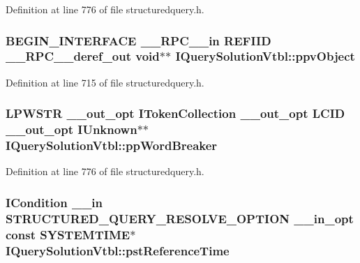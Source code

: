 Definition at line 776 of file structuredquery.\+h.

\subsubsection[{\texorpdfstring{ppv\+Object}{ppvObject}}]{\setlength{\rightskip}{0pt plus 5cm}B\+E\+G\+I\+N\+\_\+\+I\+N\+T\+E\+R\+F\+A\+CE {\bf \+\_\+\+\_\+\+R\+P\+C\+\_\+\+\_\+in} {\bf R\+E\+F\+I\+ID} {\bf \+\_\+\+\_\+\+R\+P\+C\+\_\+\+\_\+deref\+\_\+out} {\bf void}$\ast$$\ast$ I\+Query\+Solution\+Vtbl\+::ppv\+Object}\hypertarget{struct_i_query_solution_vtbl_a7b7925aac3252d89c5d16423a4005ba3}{}\label{struct_i_query_solution_vtbl_a7b7925aac3252d89c5d16423a4005ba3}


Definition at line 715 of file structuredquery.\+h.

\subsubsection[{\texorpdfstring{pp\+Word\+Breaker}{ppWordBreaker}}]{ {\bf L\+P\+W\+S\+TR} {\bf \+\_\+\+\_\+out\+\_\+opt} {\bf I\+Token\+Collection} {\bf \+\_\+\+\_\+out\+\_\+opt} {\bf L\+C\+ID} {\bf \+\_\+\+\_\+out\+\_\+opt} I\+Unknown$\ast$$\ast$ I\+Query\+Solution\+Vtbl\+::pp\+Word\+Breaker}\hypertarget{struct_i_query_solution_vtbl_a600831bab09aedb0edc24589fa8feb97}{}\label{struct_i_query_solution_vtbl_a600831bab09aedb0edc24589fa8feb97}


Definition at line 776 of file structuredquery.\+h.

\subsubsection[{\texorpdfstring{pst\+Reference\+Time}{pstReferenceTime}}]{ {\bf I\+Condition} {\bf \+\_\+\+\_\+in} {\bf S\+T\+R\+U\+C\+T\+U\+R\+E\+D\+\_\+\+Q\+U\+E\+R\+Y\+\_\+\+R\+E\+S\+O\+L\+V\+E\+\_\+\+O\+P\+T\+I\+ON} {\bf \+\_\+\+\_\+in\+\_\+opt} {\bf const} S\+Y\+S\+T\+E\+M\+T\+I\+ME$\ast$ I\+Query\+Solution\+Vtbl\+::pst\+Reference\+Time}\hypertarget{struct_i_query_solution_vtbl_a8f7720c491bb9b58bd85614ccc3c4cca}{}\label{struct_i_query_solution_vtbl_a8f7720c491bb9b58bd85614ccc3c4cca}


